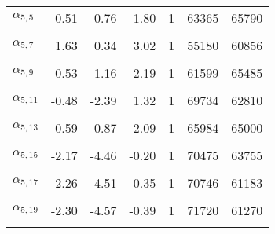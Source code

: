 \begin{longtable}[t]{lrrrrrr}
$\alpha_{5, 5}$ & 0.51 & -0.76 & 1.80 & 1 & 63365 & 65790\\
\cellcolor{gray!6}{$\alpha_{5, 6}$} & \cellcolor{gray!6}{-2.52} & \cellcolor{gray!6}{-4.71} & \cellcolor{gray!6}{-0.69} & \cellcolor{gray!6}{1} & \cellcolor{gray!6}{69656} & \cellcolor{gray!6}{61501}\\
$\alpha_{5, 7}$ & 1.63 & 0.34 & 3.02 & 1 & 55180 & 60856\\
\cellcolor{gray!6}{$\alpha_{5, 8}$} & \cellcolor{gray!6}{1.08} & \cellcolor{gray!6}{-0.17} & \cellcolor{gray!6}{2.38} & \cellcolor{gray!6}{1} & \cellcolor{gray!6}{54242} & \cellcolor{gray!6}{61416}\\
$\alpha_{5, 9}$ & 0.53 & -1.16 & 2.19 & 1 & 61599 & 65485\\
\cellcolor{gray!6}{$\alpha_{5, 10}$} & \cellcolor{gray!6}{1.85} & \cellcolor{gray!6}{-0.36} & \cellcolor{gray!6}{4.27} & \cellcolor{gray!6}{1} & \cellcolor{gray!6}{69799} & \cellcolor{gray!6}{65187}\\
$\alpha_{5, 11}$ & -0.48 & -2.39 & 1.32 & 1 & 69734 & 62810\\
\cellcolor{gray!6}{$\alpha_{5, 12}$} & \cellcolor{gray!6}{1.70} & \cellcolor{gray!6}{0.22} & \cellcolor{gray!6}{3.36} & \cellcolor{gray!6}{1} & \cellcolor{gray!6}{68203} & \cellcolor{gray!6}{63589}\\
$\alpha_{5, 13}$ & 0.59 & -0.87 & 2.09 & 1 & 65984 & 65000\\
\cellcolor{gray!6}{$\alpha_{5, 14}$} & \cellcolor{gray!6}{0.84} & \cellcolor{gray!6}{-0.51} & \cellcolor{gray!6}{2.28} & \cellcolor{gray!6}{1} & \cellcolor{gray!6}{68050} & \cellcolor{gray!6}{64442}\\
$\alpha_{5, 15}$ & -2.17 & -4.46 & -0.20 & 1 & 70475 & 63755\\
\cellcolor{gray!6}{$\alpha_{5, 16}$} & \cellcolor{gray!6}{2.45} & \cellcolor{gray!6}{0.53} & \cellcolor{gray!6}{4.68} & \cellcolor{gray!6}{1} & \cellcolor{gray!6}{68163} & \cellcolor{gray!6}{59726}\\
$\alpha_{5, 17}$ & -2.26 & -4.51 & -0.35 & 1 & 70746 & 61183\\
\cellcolor{gray!6}{$\alpha_{5, 18}$} & \cellcolor{gray!6}{-0.41} & \cellcolor{gray!6}{-1.85} & \cellcolor{gray!6}{0.95} & \cellcolor{gray!6}{1} & \cellcolor{gray!6}{70111} & \cellcolor{gray!6}{65283}\\
$\alpha_{5, 19}$ & -2.30 & -4.57 & -0.39 & 1 & 71720 & 61270\\
\cellcolor{gray!6}{$\alpha_{5, 20}$} & \cellcolor{gray!6}{0.26} & \cellcolor{gray!6}{-1.09} & \cellcolor{gray!6}{1.60} & \cellcolor{gray!6}{1} & \cellcolor{gray!6}{71284} & \cellcolor{gray!6}{69952}\\

\end{longtable}
